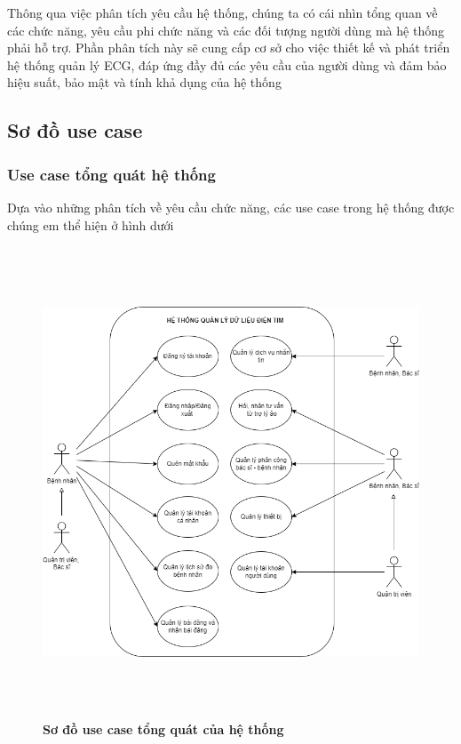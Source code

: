 Thông qua việc phân tích yêu cầu hệ thống, chúng ta có cái nhìn tổng quan về các chức năng, yêu cầu phi chức năng và 
các đối tượng người dùng mà hệ thống phải hỗ trợ. Phần phân tích này sẽ cung cấp cơ sở cho việc thiết kế và phát triển hệ thống quản lý ECG, 
đáp ứng đầy đủ các yêu cầu của người dùng và đảm bảo hiệu suất, bảo mật và tính khả dụng của hệ thống
\subsection{Sơ đồ use case}
\subsubsection{Use case tổng quát hệ thống}
Dựa vào những phân tích về yêu cầu chức năng, các use case trong hệ thống được chúng em thể hiện ở hình dưới 
  \begin{figure}[H]
    \centering
    \includegraphics[width=16cm,height=14cm]{Images/use_case/use_case_general.png}
    \caption[Sơ đồ use case tổng quát của hệ thống]{\bfseries \fontsize{12pt}{0pt}
    \selectfont Sơ đồ use case tổng quát của hệ thống}
    \label{use_case_general} %
  \end{figure}

